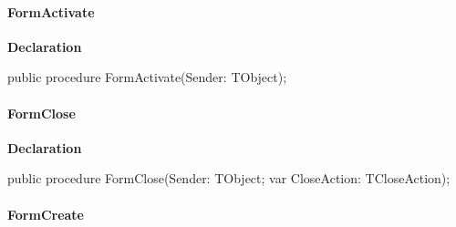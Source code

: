 \documentclass{report}
\newif\ifpdf
\begin{document}
\paragraph*{FormActivate}\hspace*{\fill}

\label{uninstall.TRMForm-FormActivate}
\begin{list}{}{
\setlength{\itemindent}{0cm}
\setlength{\listparindent}{0cm}
\setlength{\leftmargin}{\evensidemargin}
\addtolength{\leftmargin}{\tmplength}
\settowidth{\labelsep}{X}
\addtolength{\leftmargin}{\labelsep}
\setlength{\labelwidth}{\tmplength}
}
\item[\textbf{Declaration}\hfill]
\ifpdf
\begin{flushleft}
\fi
\begin{ttfamily}
public procedure FormActivate(Sender: TObject);\end{ttfamily}

\ifpdf
\end{flushleft}
\fi

\end{list}
\paragraph*{FormClose}\hspace*{\fill}

\label{uninstall.TRMForm-FormClose}
\begin{list}{}{
\setlength{\itemindent}{0cm}
\setlength{\listparindent}{0cm}
\setlength{\leftmargin}{\evensidemargin}
\addtolength{\leftmargin}{\tmplength}
\settowidth{\labelsep}{X}
\addtolength{\leftmargin}{\labelsep}
\setlength{\labelwidth}{\tmplength}
}
\item[\textbf{Declaration}\hfill]
\ifpdf
\begin{flushleft}
\fi
\begin{ttfamily}
public procedure FormClose(Sender: TObject; var CloseAction: TCloseAction);\end{ttfamily}

\ifpdf
\end{flushleft}
\fi

\end{list}
\paragraph*{FormCreate}\hspace*{\fill}
\end{document}
